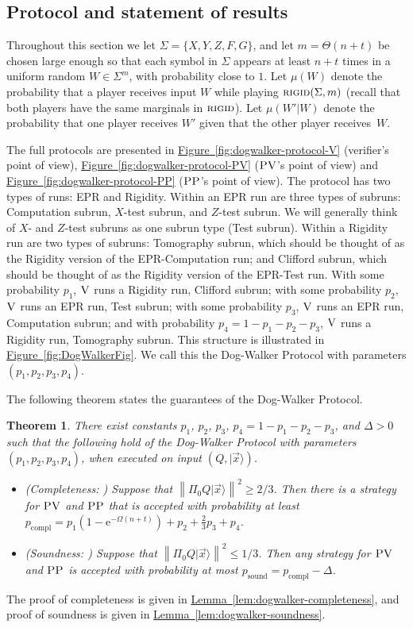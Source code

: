 \documentclass[11pt]{article}
\numberwithin{equation}{section}
\newtheorem{theorem}{Theorem}[section]
\theoremstyle{definition}
\theoremstyle{plain}
\newcommand{\eee}{\mathrm e}
\newcommand{\expref}[2]{\hyperref[#2]{#1~\ref{#2}}}
\newcommand{\ket}[1]{|#1\rangle}
\DeclareMathOperator{\sound}{sound}
\DeclareMathOperator{\compl}{compl}
\newcommand{\norm}[1]{\left\|#1\right\|}
\newcommand{\rigid}{\textsc{rigid}}
\newcommand{\ver}{\textsc{V}}
\newcommand{\pv}{\textsc{PV}}
\newcommand{\pp}{\textsc{PP}}
\begin{document}
\subsection{Protocol and statement of results}


Throughout this section we 
let $\Sigma=\{X,Y,Z,F,G\}$, and let $m=\Theta(n+t)$ be chosen 
large enough so that each symbol in $\Sigma$ appears at least $n+t$ times in a uniform random $W\in\Sigma^m$, with probability close to $1$.
Let $\mu({W})$ denote the probability that a player receives input ${W}$ while playing $\rigid(\Sigma,m)$ (recall that both players have the same marginals in $\rigid$). Let $\mu({W}'|{W})$ denote the probability that one player receives ${W}'$ given that the other player receives~${W}$. 

The full protocols are presented in \expref{Figure}{fig:dogwalker-protocol-V} (verifier's point of view), \expref{Figure}{fig:dogwalker-protocol-PV} ($\pv$'s point of view) and \expref{Figure}{fig:dogwalker-protocol-PP} ($\pp$'s point of view). The protocol has two 
types of runs: 
EPR and Rigidity. Within an EPR run are three 
types of subruns: 
Computation subrun, $X$-test subrun, and $Z$-test subrun. We will generally think of $X$- and $Z$-test subruns as one subrun type (Test subrun). Within a Rigidity run are two types of subruns: Tomography subrun, which should be thought of as the Rigidity version of the EPR-Computation run; and Clifford subrun, which should be thought of as the Rigidity version of the EPR-Test run. With some probability $p_1$, $\ver$ runs a Rigidity run, Clifford subrun; with some probability $p_2$, $\ver$ runs an EPR run, Test subrun; with some probability $p_3$, $\ver$ runs an EPR run, Computation subrun; and with probability $p_4=1-p_1-p_2-p_3$, $\ver$ runs a Rigidity run, Tomography subrun. This structure is illustrated in \expref{Figure}{fig:DogWalkerFig}. We call this the Dog-Walker Protocol with parameters $(p_1,p_2,p_3,p_4)$.



The following theorem states the guarantees of the Dog-Walker Protocol.

\begin{theorem}\label{thm:dog-walker}
There exist constants $p_1$, $p_2$, $p_3$, $p_4=1-p_1-p_2-p_3$, and $\Delta>0$ such that the following hold of the Dog-Walker Protocol with parameters $(p_1,p_2,p_3,p_4)$, when executed on input $(Q,\ket{\vec{x}})$.
\begin{itemize}
\item (Completeness: ) Suppose that $\norm{\Pi_0Q\ket{\vec{x}}}^2\geq 2/3$. Then
  there is a strategy for $\pv$ and $\pp$ that is accepted with probability at
    least $p_{\compl}=p_1(1-\eee^{-\Omega(n+t)})+p_2+\frac{2}{3}p_3 +
    p_4$. 
\item (Soundness: ) Suppose that $\norm{\Pi_0Q\ket{\vec{x}}}^2\leq 1/3$. Then any strategy for $\pv$ and $\pp$ is accepted with probability at most $p_{\sound}=p_{\compl}-\Delta$. 
\end{itemize}
\end{theorem}
\noindent The proof of completeness is given in \expref{Lemma}{lem:dogwalker-completeness}, and proof of soundness is given in \expref{Lemma}{lem:dogwalker-soundness}. 
\end{document}
